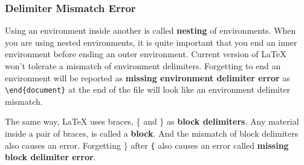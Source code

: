 \documentclass{article}
\begin{document}
\subsubsection{Delimiter Mismatch Error}
Using an environment inside another is called \textbf{nesting} of environments. When you are using nested environments, it is quite important that you end an inner environment before ending an outer environment. Current version of \LaTeX{} won't tolerate a mismatch of environment delimiters. Forgetting to end an environment will be reported as \textbf{missing environment delimiter error} as \texttt{\textbackslash end\{document\}} at the end of the file will look like an environment delimiter mismatch.

The same way, \LaTeX{} uses braces, \{ and \} as \textbf{block delimiters}. Any material inside a pair of braces, is called a \textbf{block}. And the mismatch of block delimiters also causes an error. Forgetting \} after \texttt{\{} also causes an error called \textbf{missing block delimiter error}.
\end{document}
